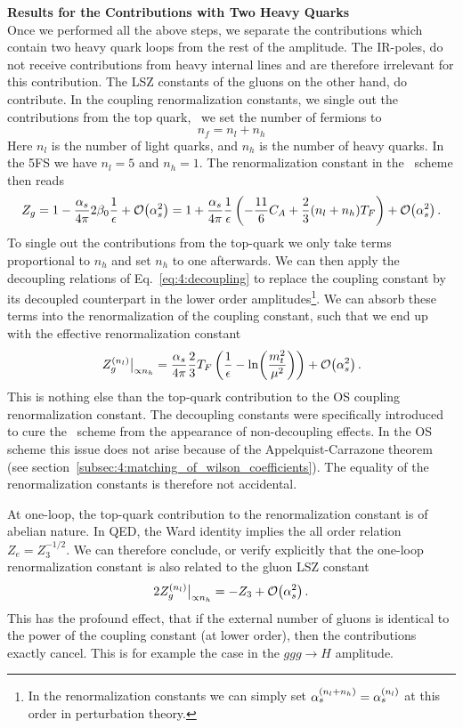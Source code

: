\textbf{Results for the Contributions with Two Heavy Quarks} \\
Once we performed all the above steps, we separate the contributions which contain two heavy quark loops from the rest of the amplitude. The \acs{IR}-poles, do not receive contributions from heavy internal lines and are therefore irrelevant for this contribution. The LSZ constants of the gluons on the other hand, do contribute. In the coupling renormalization constants, we single out the contributions from the top quark, \ie\ we set the number of fermions to
\begin{equation}
n_f = n_l + n_h
\end{equation}
Here $n_l$ is the number of light quarks, and $n_h$ is the number of heavy quarks. In the 5\acs{FS} we have $n_l = 5$ and $n_h = 1$. The renormalization constant in the \MS\ scheme then reads
\begin{equation}
Z_g = 1 - \frac{\alpha_s}{4 \pi}  2 \beta_0 \frac{1}{\epsilon} + \mathcal{O}\!\left(\alpha_s^2\right) = 1 + \frac{\alpha_s}{4 \pi} \frac{1}{\epsilon} \left(- \frac{11}{6} C_A + \frac{2}{3} (n_l + n_h) T_F \right) + \mathcal{O}\!\left(\alpha_s^2\right).
\end{equation}
To single out the contributions from the top-quark we only take terms proportional to $n_h$ and set $n_h$ to one afterwards. We can then apply the decoupling relations of Eq.~\eqref{eq:4:decoupling} to replace the coupling constant by its decoupled counterpart in the lower order amplitudes\footnote{In the renormalization constants we can simply set $\alpha_s^{(n_l + n_h)} = \alpha_s^{(n_l)}$ at this order in perturbation theory.}. We can absorb these terms into the renormalization of the coupling constant, such that we end up with the effective renormalization constant
\begin{equation}
Z_g^{(n_l)} \big \vert_{\propto n_h} = \frac{\alpha_s}{4 \pi} \frac{2}{3} T_F \left(\frac{1}{\epsilon} - \ln\!\left(\frac{m_t^2}{\mu^2}\right) \right) + \mathcal{O}\!\left(\alpha_s^2\right).
\end{equation}
This is nothing else than the top-quark contribution to the \acs{OS} coupling renormalization constant. The decoupling constants were specifically introduced to cure the \MS\ scheme from the appearance of non-decoupling effects. In the \acs{OS} scheme this issue does not arise because of the Appelquist-Carrazone theorem (see section~\ref{subsec:4:matching_of_wilson_coefficients}). The equality of the renormalization constants is therefore not accidental.

At one-loop, the top-quark contribution to the renormalization constant is of abelian nature. In \acs{QED}, the Ward identity implies the all order relation $Z_e = Z_3^{-1/2}$. We can therefore conclude, or verify explicitly that the one-loop renormalization constant is also related to the gluon LSZ constant
\begin{equation}
2 Z_g^{(n_l)} \big \vert_{\propto n_h} = - Z_3 + \mathcal{O}\!\left(\alpha_s^2\right).
\end{equation}
This has the profound effect, that if the external number of gluons is identical to the power of the coupling constant (at lower order), then the contributions exactly cancel. This is for example the case in the $ggg \rightarrow H$ amplitude.

